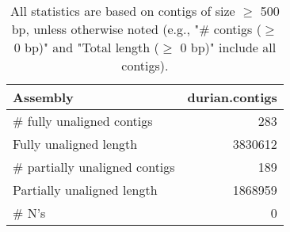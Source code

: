\documentclass[12pt,a4paper]{article}
\begin{document}
\begin{table}[ht]
\begin{center}
\caption{All statistics are based on contigs of size $\geq$ 500 bp, unless otherwise noted (e.g., "\# contigs ($\geq$ 0 bp)" and "Total length ($\geq$ 0 bp)" include all contigs).}
\begin{tabular}{|l*{1}{|r}|}
\hline
Assembly & durian.contigs \\ \hline
\# fully unaligned contigs & 283 \\ \hline
Fully unaligned length & 3830612 \\ \hline
\# partially unaligned contigs & 189 \\ \hline
Partially unaligned length & 1868959 \\ \hline
\# N's & 0 \\ \hline
\end{tabular}
\end{center}
\end{table}
\end{document}

